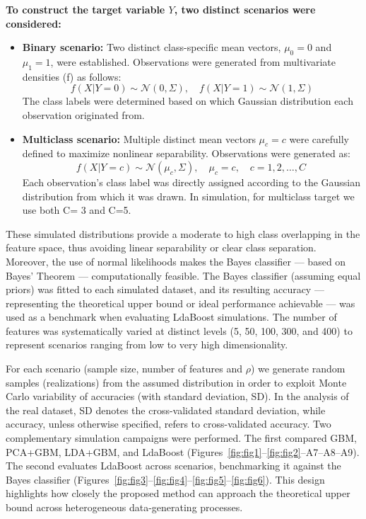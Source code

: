 \documentclass[11pt,a4paper]{article}
\begin{document}
\textbf{To construct the target variable $Y$, two distinct scenarios were considered:}

\begin{itemize}
    \item \textbf{Binary scenario:} Two distinct class-specific mean vectors, $\mu_0=0$ and $\mu_1=1$, were established. Observations were generated from multivariate densities (f) as follows:
    \[
    f(X|Y=0) \sim \mathcal{N}(0,\Sigma), \quad f(X|Y=1) \sim \mathcal{N}(1,\Sigma)
    \]
    The class labels were determined based on which Gaussian distribution each observation originated from.
    
    \item \textbf{Multiclass scenario:} Multiple distinct mean vectors $\mu_c = c$ were carefully defined to maximize nonlinear separability. Observations were generated as:
    \[
    f(X|Y=c) \sim \mathcal{N}(\mu_c,\Sigma),\quad \mu_c=c, \quad c = 1,2,\dots,C\
    \]
    Each observation's class label was directly assigned according to the Gaussian distribution from which it was drawn. In simulation, for multiclass target we use both C= 3 and C=5.
\end{itemize}

These simulated distributions provide a moderate to high class overlapping in the feature space, thus avoiding linear separability or clear class separation. Moreover, the use of normal likelihoods makes the Bayes classifier — based on Bayes' Theorem — computationally feasible. The Bayes classifier (assuming equal priors) was fitted to each simulated dataset, and its resulting accuracy — representing the theoretical upper bound or ideal performance achievable — was used as a benchmark when evaluating LdaBoost simulations.
The number of features was systematically varied at distinct levels (5, 50, 100, 300, and 400) to represent scenarios ranging from low to very high dimensionality. 

For each scenario (sample size, number of features and $\rho$) we generate random samples (realizations) from the assumed distribution in order to exploit Monte Carlo variability of accuracies (with standard deviation, SD). 
In the analysis of the real dataset, SD denotes the cross-validated standard deviation, while accuracy, unless otherwise specified, refers to cross-validated accuracy.
Two complementary simulation campaigns were performed. The first compared GBM, PCA+GBM, LDA+GBM, and LdaBoost (Figures~\ref{fig:fig1}--\ref{fig:fig2}--A7--A8--A9). 
The second evaluates LdaBoost across scenarios, benchmarking it against the Bayes classifier (Figures~\ref{fig:fig3}--\ref{fig:fig4}--\ref{fig:fig5}--\ref{fig:fig6}). This design highlights how closely the proposed method can approach the theoretical upper bound across heterogeneous data-generating processes.
\end{document}

